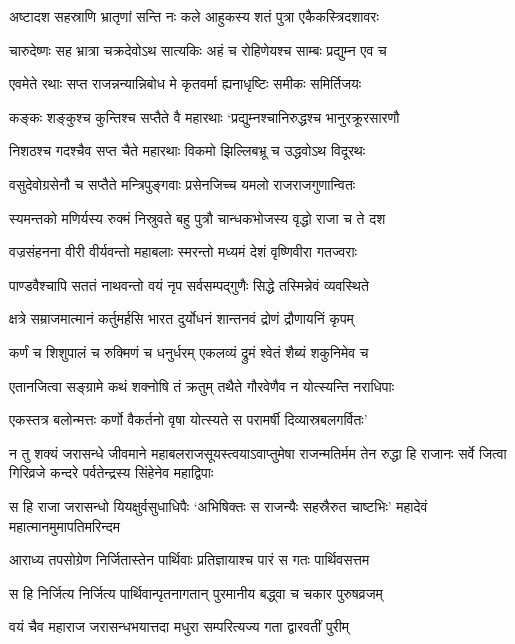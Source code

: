 \twolineshloka
{अष्टादश सहस्राणि भ्रातृणां सन्ति नः कले}
{आहुकस्य शतं पुत्रा एकैकस्त्रिदशावरः}


\twolineshloka
{चारुदेष्णः सह भ्रात्रा चक्रदेवोऽथ सात्यकिः}
{अहं च रोहिणेयश्च साम्बः प्रद्युम्न एव च}


\twolineshloka
{एवमेते रथाः सप्त राजन्नन्यान्निबोध मे}
{कृतवर्मा ह्यनाधृष्टिः समीकः समिर्तिजयः}


\twolineshloka
{कङ्कः शङ्कुश्च कुन्तिश्च सप्तैते वै महारथाः}
{`प्रद्युम्नश्चानिरुद्धश्च भानुरक्रूरसारणौ}


\twolineshloka
{निशठश्च गदश्चैव सप्त चैते महारथाः}
{विकमो झिल्लिबभ्रू च उद्धवोऽथ विदूरथः}


\twolineshloka
{वसुदेवोग्रसेनौ च सप्तैते मन्त्रिपुङ्गवाः}
{प्रसेनजिच्च यमलो राजराजगुणान्वितः}


\twolineshloka
{स्यमन्तको मणिर्यस्य रुक्मं निस्रुवते बहु}
{पुत्रौ चान्धकभोजस्य वृद्धो राजा च ते दश}


\twolineshloka
{वज्रसंहनना वीरी वीर्यवन्तो महाबलाः}
{स्मरन्तो मध्यमं देशं वृष्णिवीरा गतज्वराः}


\twolineshloka
{पाण्डवैश्चापि सततं नाथवन्तो वयं नृप}
{सर्वसम्पद्गुणैः सिद्धे तस्मिन्नेवं व्यवस्थिते}


\twolineshloka
{क्षत्रे सम्राजमात्मानं कर्तुमर्हसि भारत}
{दुर्योधनं शान्तनवं द्रोणं द्रौणायनिं कृपम्}


\twolineshloka
{कर्णं च शिशुपालं च रुक्मिणं च धनुर्धरम्}
{एकलव्यं द्रुमं श्वेतं शैब्यं शकुनिमेव च}


\twolineshloka
{एतानजित्वा सङ्ग्रामे कथं शक्नोषि तं क्रतुम्}
{तथैते गौरवेणैव न योत्स्यन्ति नराधिपाः}


\twolineshloka
{एकस्तत्र बलोन्मत्तः कर्णो वैकर्तनो वृषा}
{योत्स्यते स परामर्षी दिव्यास्रबलगर्वितः'}


न तु शक्यं जरासन्धे जीवमाने महाबलराजसूयस्त्वयाऽवाप्तुमेषा राजन्मतिर्मम
\twolineshloka
{तेन रुद्धा हि राजानः सर्वे जित्वा गिरिव्रजे}
{कन्दरे पर्वतेन्द्रस्य सिंहेनेव महाद्विपाः}


\threelineshloka
{स हि राजा जरासन्धो यियक्षुर्वसुधाधिपैः}
{`अभिषिक्तः स राजन्यैः सहस्रैरुत चाष्टभिः'}
{महादेवं महात्मानमुमापतिमरिन्दम}


\twolineshloka
{आराध्य तपसोग्रेण निर्जितास्तेन पार्थिवाः}
{प्रतिज्ञायाश्च पारं स गतः पार्थिवसत्तम}


\twolineshloka
{स हि निर्जित्य निर्जित्य पार्थिवान्पृतनागतान्}
{पुरमानीय बद्ध्वा च चकार पुरुषव्रजम्}


\twolineshloka
{वयं चैव महाराज जरासन्धभयात्तदा}
{मधुरा सम्परित्यज्य गता द्वारवतीं पुरीम्}


